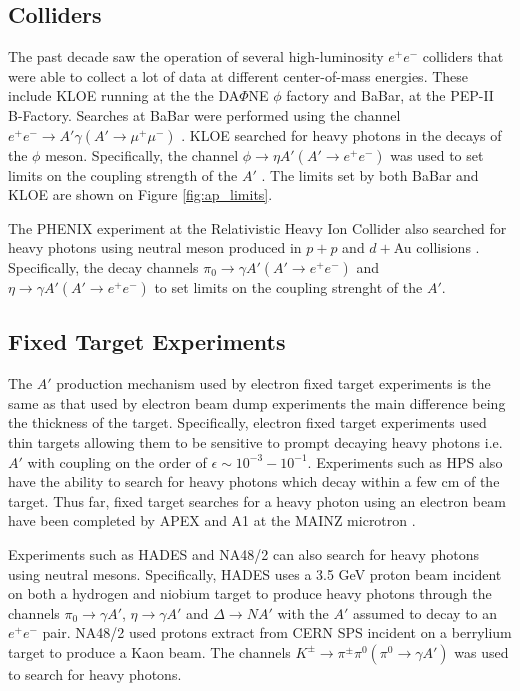\subsection{Colliders}

The past decade saw the operation of several high-luminosity $e^+e^-$ colliders 
that were able to collect a lot of data at different center-of-mass energies.
These include KLOE running at the the DA$\Phi$NE $\phi$ factory and BaBar, 
at the PEP-II B-Factory. Searches at BaBar were performed using the channel 
$e^+e^- \rightarrow A' \gamma (A' \rightarrow \mu^+\mu^-)$ 
\cite{Reece:2009un, Aubert:2009cp}.  KLOE 
searched for heavy photons in the decays of the $\phi$ meson.  Specifically, 
the channel $\phi \rightarrow \eta A' (A' \rightarrow e^+e^-)$ was used to
set limits on the coupling strength of the $A'$ 
\cite{Babusci:2012cr, Archilli:2011zc}.
The limits set by both BaBar and KLOE are shown on Figure \ref{fig:ap_limits}.

The PHENIX experiment at the Relativistic Heavy Ion Collider also searched for
heavy photons using neutral meson produced in $p+p$  and $d+$Au collisions 
\cite{Adare:2014mgk}.
Specifically, the decay channels $\pi_0 \rightarrow \gamma A' (A' \rightarrow e^+e^-)$
and $\eta \rightarrow \gamma A' (A' \rightarrow e^+e^-)$ to set limits on the 
coupling strenght of the $A'$.

\subsection{Fixed Target Experiments}

The $A'$ production mechanism used by electron fixed target experiments is 
the same as that used by electron beam dump experiments the main difference
being the thickness of the target.  Specifically, electron fixed target 
experiments used thin targets allowing them to be sensitive to prompt 
decaying heavy photons i.e. $A'$ with coupling on the order of 
$\epsilon \sim 10^{-3} - 10^{-1}$.  Experiments such as HPS also have the 
ability to search  for heavy photons which decay within a few cm of the target.
Thus far, fixed target searches for a heavy photon using an electron beam
have been completed by APEX \cite{Abrahamyan:2011gv} and A1 at the 
MAINZ microtron \cite{Merkel:2014avp}.

Experiments such as HADES \cite{Agakishiev:2013fwl} and NA48/2 \cite{Batley:2015lha}
can also search for heavy photons using 
neutral mesons.  Specifically, HADES uses a 3.5 GeV proton beam incident on 
both a hydrogen and niobium target to produce heavy photons through the 
channels $\pi_0 \rightarrow \gamma A'$, $\eta \rightarrow \gamma A'$ and 
$\Delta \rightarrow N A'$ with the $A'$ assumed to decay to an $e^+e^-$ pair.
NA48/2 used protons extract from CERN SPS incident on a berrylium target to 
produce a Kaon beam.  The channels $K^{\pm} \rightarrow \pi^{\pm}\pi^0 (\pi^0 \rightarrow \gamma A')$
was used to search for heavy photons.  
